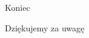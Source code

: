 \documentclass[
	11pt,]{beamer}
\begin{document}

\begin{frame}[plain] %
	\begin{center}
		{\Huge Koniec}
		
		\bigskip\bigskip %
		
		{\LARGE Dziękujemy za uwagę}
	\end{center}
\end{frame}

\end{document}
